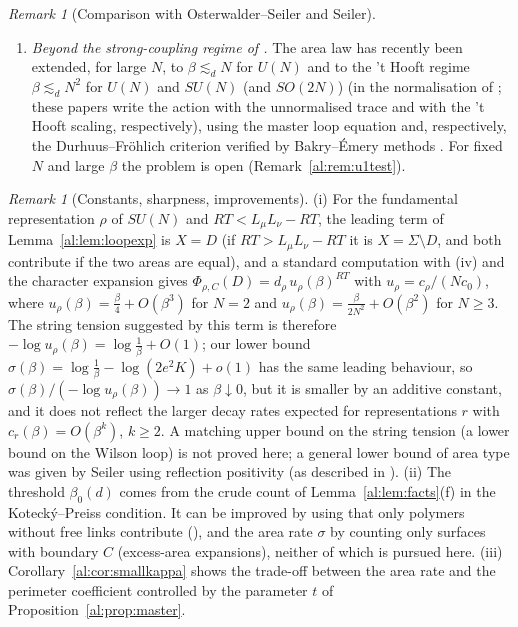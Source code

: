 \documentclass[11pt,a4paper]{article}
\theoremstyle{definition}
\theoremstyle{remark}
\newtheorem{remark}[theorem]{Remark}
\newcommand{\Fref}[3]{\cite[#1~`#2' (\texttt{#3})]{F}}
\begin{document}
\begin{remark}[Comparison with Osterwalder--Seiler and Seiler]
\begin{enumerate}[label=(\roman*)]
with non-trivial centre uniformly.
\item \emph{Beyond the strong-coupling regime of \cite{OS78}.} The area law has recently been extended, for large $N$,
to $\beta\lesssim_dN$ for $U(N)$ \cite{CNS25a} and to the 't Hooft regime $\beta\lesssim_dN^2$ for $U(N)$ and $SU(N)$ (and $SO(2N)$)
\cite{CNS25b} (in the normalisation of \cite{F}; these papers write the action with the unnormalised trace and with
the 't Hooft scaling, respectively), using the master loop equation and, respectively, the Durhuus--Fröhlich
criterion \cite{DF80} verified by Bakry--Émery methods \cite{SZZ23}. For fixed $N$ and large $\beta$ the problem is
open (Remark~\ref{al:rem:u1test}).
\end{enumerate}
\end{remark}

\begin{remark}[Constants, sharpness, improvements]\label{al:rem:constants}
(i) For the fundamental representation $\rho$ of $SU(N)$ and $RT<L_\mu L_\nu-RT$, the leading term of
Lemma~\ref{al:lem:loopexp} is $X=D$ (if $RT>L_\mu L_\nu-RT$ it is $X=\Sigma\setminus D$, and both contribute if the two areas
are equal), and a
standard computation with \Fref{Cited Theorem}{Haar measure, Peter--Weyl}{thm:pw}(iv) and the character expansion gives
$\Phi_{\rho,C}(D)=d_\rho\,u_\rho(\beta)^{RT}$ with $u_\rho=c_\rho/(Nc_0)$, where $u_\rho(\beta)=\frac\beta4+O(\beta^3)$ for $N=2$
and $u_\rho(\beta)=\frac\beta{2N^2}+O(\beta^2)$ for $N\ge3$. The string tension suggested by this term is therefore
$-\log u_\rho(\beta)=\log\frac1\beta+O(1)$; our lower bound $\sigma(\beta)=\log\frac1\beta-\log(2e^2K)+o(1)$ has the same
leading behaviour, so $\sigma(\beta)/(-\log u_\rho(\beta))\to1$ as $\beta\downarrow0$, but it is smaller by an additive
constant, and it does not reflect the larger decay rates expected for representations $r$ with
$c_r(\beta)=O(\beta^k)$, $k\ge2$. A matching upper bound on the string tension (a lower bound on the Wilson loop) is not
proved here; a general lower bound of area type was given by Seiler using reflection positivity \cite{Sei78} (as
described in \cite[Section~3]{Cha19a}).
(ii) The threshold $\beta_0(d)$ comes from the crude count of Lemma~\ref{al:lem:facts}(f) in the Kotecký--Preiss
condition. It can be improved by using that only polymers without free links contribute
(\Fref{Lemma}{Closed surfaces}{lem:closed}), and the area rate $\sigma$ by counting only surfaces with boundary $C$
(excess-area expansions), neither of which is pursued here.
(iii) Corollary~\ref{al:cor:smallkappa} shows the trade-off between the area rate and the perimeter coefficient
controlled by the parameter $t$ of Proposition~\ref{al:prop:master}.
\end{remark}
\end{document}
